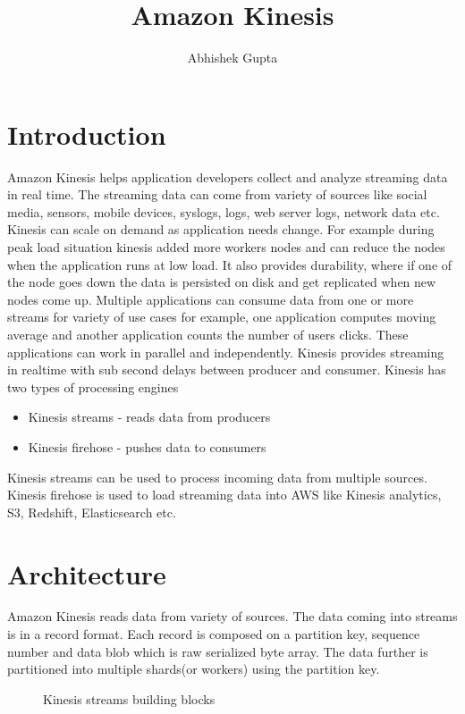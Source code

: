 \documentclass[9pt,twocolumn,twoside]{../../styles/osajnl}
\title{Amazon Kinesis}
\author[1,*]{Abhishek Gupta}
\affil[1]{School of Informatics and Computing, Bloomington, IN 47408, U.S.A.}
\affil[*]{Corresponding authors: abhigupt@iu.edu}
\begin{document}
\maketitle

\section{Introduction}
Amazon Kinesis \cite{www-kinesis} helps application developers collect and
analyze streaming data in real time. The streaming data can come from variety of
sources like social media, sensors, mobile devices, syslogs, logs, web server
logs, network data etc. Kinesis can scale on demand as application needs change.
For example during peak load situation kinesis added more workers nodes and can
reduce the nodes when the application runs at low load. It also provides
durability, where if one of the node goes down the data is persisted on disk and
get replicated when new nodes come up. Multiple applications can consume data
from one or more streams for variety of use cases for example, one application
computes moving average and another application counts the number of users
clicks. These applications can work in parallel and independently. Kinesis
provides streaming in realtime with sub second delays between producer and
consumer. Kinesis has two types of processing engines 
\begin{itemize}
	\item Kinesis streams - reads data from producers
	\item Kinesis firehose - pushes data to consumers
\end{itemize}

Kinesis streams can be used to process incoming data from multiple sources.
Kinesis firehose is used to load streaming data into AWS like Kinesis analytics,
S3, Redshift, Elasticsearch etc.

\section{Architecture} 
Amazon Kinesis reads data from variety of sources. The data coming into streams
is in a record format. Each record is composed on a partition key, sequence
number and data blob which is raw serialized byte array. The data further is
partitioned into multiple shards(or workers) using the partition key. 

\begin{figure}[htbp]
\centering
{}
\caption{Kinesis streams building blocks \cite{www-kinesis-arch}}
\label{fig:false-color}
\end{figure}
\end{document}
